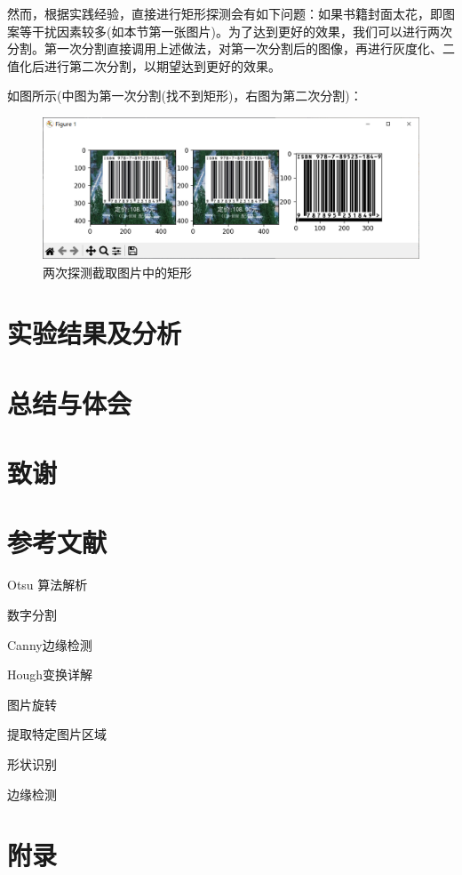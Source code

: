 \documentclass{ctexart}
\begin{document}
然而，根据实践经验，直接进行矩形探测会有如下问题：如果书籍封面太花，即图案等干扰因素较多(如本节第一张图片)。为了达到更好的效果，我们可以进行两次分割。第一次分割直接调用上述做法，对第一次分割后的图像，再进行灰度化、二值化后进行第二次分割，以期望达到更好的效果。

如图所示(中图为第一次分割(找不到矩形)，右图为第二次分割)：

\begin{figure}[H]
    \centering
    \includegraphics[height=120pt]{sample_graphSplit2}
    \caption{两次探测截取图片中的矩形}
\end{figure}

\section{实验结果及分析}
\section{总结与体会}
\section{致谢}
\section{参考文献}
Otsu 算法解析

数字分割

Canny边缘检测

Hough变换详解

图片旋转

提取特定图片区域

形状识别

边缘检测

\section{附录}
\end{document}
